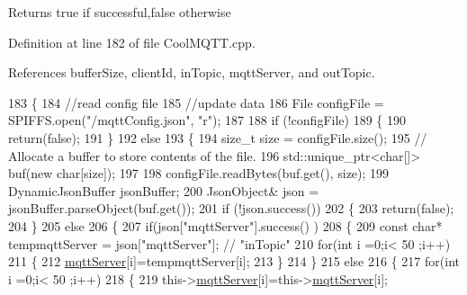 \begin{DoxyReturn}{Returns}
true if successful,false otherwise 
\end{DoxyReturn}


Definition at line 182 of file Cool\+M\+Q\+T\+T.\+cpp.



References buffer\+Size, client\+Id, in\+Topic, mqtt\+Server, and out\+Topic.


\begin{DoxyCode}
183 \{
184     \textcolor{comment}{//read config file}
185     \textcolor{comment}{//update data}
186     File configFile = SPIFFS.open(\textcolor{stringliteral}{"/mqttConfig.json"}, \textcolor{stringliteral}{"r"});
187 
188     \textcolor{keywordflow}{if} (!configFile) 
189     \{
190         \textcolor{keywordflow}{return}(\textcolor{keyword}{false});
191     \}
192     \textcolor{keywordflow}{else}
193     \{
194         \textcolor{keywordtype}{size\_t} size = configFile.size();
195         \textcolor{comment}{// Allocate a buffer to store contents of the file.}
196         std::unique\_ptr<char[]> buf(\textcolor{keyword}{new} \textcolor{keywordtype}{char}[size]);
197 
198         configFile.readBytes(buf.get(), size);
199         DynamicJsonBuffer jsonBuffer;
200         JsonObject& json = jsonBuffer.parseObject(buf.get());
201         \textcolor{keywordflow}{if} (!json.success()) 
202         \{
203               \textcolor{keywordflow}{return}(\textcolor{keyword}{false});
204         \} 
205         \textcolor{keywordflow}{else}
206         \{               
207                 \textcolor{keywordflow}{if}(json[\textcolor{stringliteral}{"mqttServer"}].success() )
208                 \{           
209                     \textcolor{keyword}{const} \textcolor{keywordtype}{char}* tempmqttServer = json[\textcolor{stringliteral}{"mqttServer"}]; \textcolor{comment}{// "inTopic"}
210                     \textcolor{keywordflow}{for}(\textcolor{keywordtype}{int} i =0;i< 50 ;i++)
211                     \{
212                         \hyperlink{classCoolMQTT_ab8bb951f87ddbf92db74c2ad16a3e53e}{mqttServer}[i]=tempmqttServer[i];
213                     \}
214                 \}
215                 \textcolor{keywordflow}{else}
216                 \{
217                     \textcolor{keywordflow}{for}(\textcolor{keywordtype}{int} i =0;i< 50 ;i++)
218                     \{
219                         this->\hyperlink{classCoolMQTT_ab8bb951f87ddbf92db74c2ad16a3e53e}{mqttServer}[i]=this->\hyperlink{classCoolMQTT_ab8bb951f87ddbf92db74c2ad16a3e53e}{mqttServer}[i];

\end{DoxyCode}
